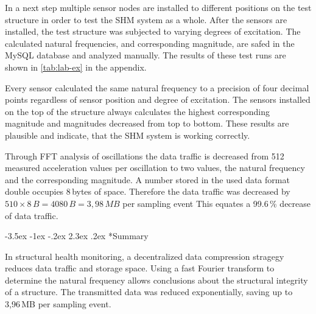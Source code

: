\documentclass[12pt,a4paper]{scrartcl}
\makeatletter
\renewcommand\section{\@startsection{section}{1}{\z@}%
                     {-3.5ex \@plus -1ex \@minus -.2ex}%
                     {2.3ex \@plus.2ex}%
                     {\normalfont\large\bfseries}}
\makeatother
\begin{document}
In a next step multiple sensor nodes are installed to different positions on the test structure in order to test the SHM system as a whole.
After the sensors are installed, the test structure was subjected to varying degrees of excitation.
The calculated natural frequencies, and corresponding magnitude, are safed in the MySQL database and analyzed manually.
The results of these test runs are shown in \autoref{tab:lab-ex} in the appendix.

Every sensor calculated the same natural frequency to a precision of four decimal points regardless of sensor position and degree of excitation.
The sensors installed on the top of the structure always calculates the highest corresponding magnitude and magnitudes decreased from top to bottom.
These results are plausible and indicate, that the SHM system is working correctly.

Through FFT analysis of oscillations the data traffic is decreased from 512 measured acceleration values per oscillation to two values, the natural frequency and the corresponding magnitude.
A number stored in the used data format double occupies 8\,bytes of space.
Therefore the data traffic was decreased by $510\times8\,B = 4080\,B = 3,98\,MB$ per sampling event
This equates a 99.6\,\% decrease of data traffic.


\section*{Summary}

In structural health monitoring, a decentralized data compression stragegy reduces data traffic and storage space.
Using a fast Fourier transform to determine the natural frequency allows conclusions about the structural integrity of a structure.
The transmitted data was reduced exponentially, saving up to 3,96\,MB per sampling event.




\end{document}
